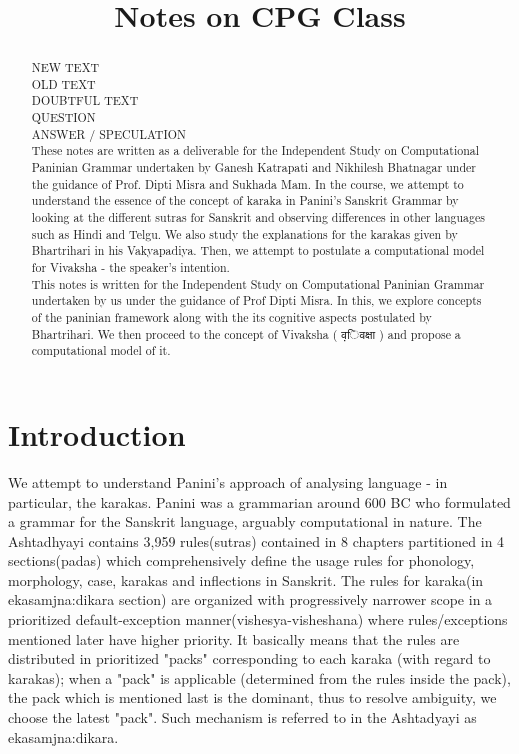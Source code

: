 \documentclass[a4paper,10pt]{article}
\title{Notes on CPG Class}
\author{}
\begin{document}
\maketitle

\newpage

\tableofcontents

\newpage

\begin{abstract}
\color{black!100}
NEW TEXT\\
\color{black!60}
OLD TEXT\\
\color{blue!100}
DOUBTFUL TEXT\\
\color{red!100}
QUESTION\\
\color{green!100}
ANSWER / SPECULATION\\
\color{black!100}
These notes are written as a deliverable for the Independent Study on Computational Paninian Grammar undertaken by Ganesh Katrapati and Nikhilesh Bhatnagar under the guidance of Prof. Dipti Misra and Sukhada Mam. In the course, we attempt to understand the essence of the concept of karaka in Panini's Sanskrit Grammar by looking at the different sutras for Sanskrit and observing differences in other languages such as Hindi and Telgu. We also study the explanations for the karakas given by Bhartrihari in his Vakyapadiya. Then, we attempt to postulate a computational model for Vivaksha - the speaker's intention.\\
\color{black!60}
  This notes is written for the Independent Study on Computational Paninian Grammar undertaken by us under the guidance of Prof Dipti Misra.
  In this, we explore concepts of the paninian framework along with the its cognitive aspects postulated by Bhartrihari.
  We then proceed to the concept of Vivaksha ( {\d विवक्षा }) and propose a computational model of it.\\
\end{abstract}
\newpage
\section{Introduction}
\color{black!100}
We attempt to understand Panini's approach of analysing language - in particular, the karakas. Panini was a grammarian around 600 BC who formulated a grammar for the Sanskrit language, arguably computational in nature. The Ashtadhyayi contains 3,959 rules(sutras) contained in 8 chapters partitioned in 4 sections(padas) which comprehensively define the usage rules for phonology, morphology, case, karakas and inflections in Sanskrit. The rules for karaka(in ekasamjna:dikara section) are organized with progressively narrower scope in a prioritized default-exception manner(vishesya-visheshana) where rules/exceptions mentioned later have higher priority. It basically means that the rules are distributed in prioritized "packs" corresponding to each karaka (with regard to karakas); when a "pack" is applicable (determined from the rules inside the pack), the pack which is mentioned last is the dominant, thus to resolve ambiguity, we choose the latest "pack". Such mechanism is referred to in the Ashtadyayi as ekasamjna:dikara.
\end{document}
